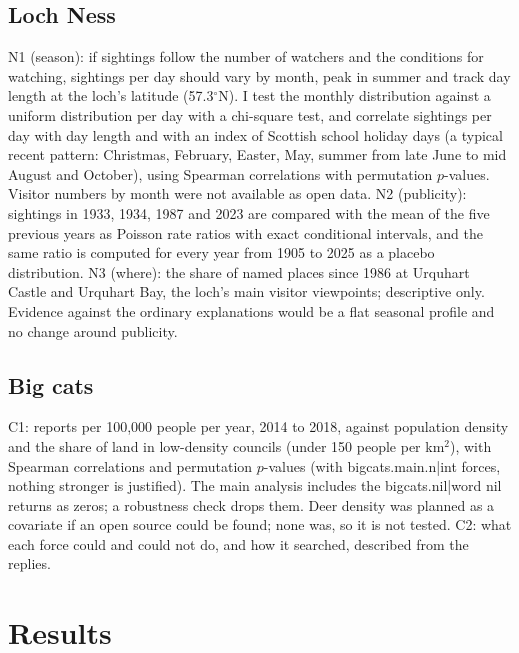 \documentclass[11pt,a4paper]{article}
\begin{document}
\subsection{Loch Ness}
N1 (season): if sightings follow the number of watchers and the conditions for watching, sightings per day should vary by month, peak in summer and track day length at the loch's latitude (57.3$^\circ$N). I test the monthly distribution against a uniform distribution per day with a chi-square test, and correlate sightings per day with day length and with an index of Scottish school holiday days (a typical recent pattern: Christmas, February, Easter, May, summer from late June to mid August and October), using Spearman correlations with permutation $p$-values. Visitor numbers by month were not available as open data. N2 (publicity): sightings in 1933, 1934, 1987 and 2023 are compared with the mean of the five previous years as Poisson rate ratios with exact conditional intervals, and the same ratio is computed for every year from 1905 to 2025 as a placebo distribution. N3 (where): the share of named places since 1986 at Urquhart Castle and Urquhart Bay, the loch's main visitor viewpoints; descriptive only. Evidence against the ordinary explanations would be a flat seasonal profile and no change around publicity.

\subsection{Big cats}
C1: reports per 100,000 people per year, 2014 to 2018, against population density and the share of land in low-density councils (under 150 people per km$^2$), with Spearman correlations and permutation $p$-values (with {{bigcats.main.n|int}} forces, nothing stronger is justified). The main analysis includes the {{bigcats.nil|word}} nil returns as zeros; a robustness check drops them. Deer density was planned as a covariate if an open source could be found; none was, so it is not tested. C2: what each force could and could not do, and how it searched, described from the replies.

\section{Results}\label{sec:results}
\end{document}
